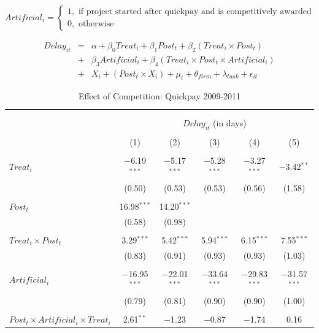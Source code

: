 \documentclass[
]{article}
\begin{document}
\[ Artificial_i = \begin{cases} 1 , \text{ if project started after quickpay and is competitively awarded}\\ 0 , \text{ otherwise } \end{cases}
\]

\[ \begin{aligned}
Delay_{it} &=& \alpha+\beta_0 Treat_i + \beta_1 Post_t + \beta_2 (Treat_i \times Post_t) \\
&+&\beta_3 Artificial_i + \beta_4 (Treat_i \times Post_t \times Artificial_i) \\ 
&+&X_i + (Post_t \times X_i) + \mu_t + \theta_{firm} + \lambda_{task}+ \epsilon_{it}
\end{aligned}\]

\begin{table}[H] \centering 
  \caption{Effect of Competition: Quickpay 2009-2011} 
  \label{} 
\small 
\begin{tabular}{@{\extracolsep{-2pt}}lccccc} 
\\[-1.8ex]\hline 
\hline \\[-1.8ex] 
\\[-1.8ex] & \multicolumn{5}{c}{$Delay_{it}$ (in days)} \\ 
\\[-1.8ex] & (1) & (2) & (3) & (4) & (5)\\ 
\hline \\[-1.8ex] 
 $Treat_i$ & $-$6.19$^{***}$ & $-$5.17$^{***}$ & $-$5.28$^{***}$ & $-$3.27$^{***}$ & $-$3.42$^{**}$ \\ 
  & (0.50) & (0.53) & (0.53) & (0.56) & (1.58) \\ 
  & & & & & \\ 
 $Post_t$ & 16.98$^{***}$ & 14.20$^{***}$ &  &  &  \\ 
  & (0.58) & (0.98) &  &  &  \\ 
  & & & & & \\ 
 $Treat_i \times Post_t$ & 3.29$^{***}$ & 5.42$^{***}$ & 5.94$^{***}$ & 6.15$^{***}$ & 7.55$^{***}$ \\ 
  & (0.83) & (0.91) & (0.93) & (0.93) & (1.03) \\ 
  & & & & & \\ 
 $Artificial_i$ & $-$16.95$^{***}$ & $-$22.01$^{***}$ & $-$33.64$^{***}$ & $-$29.83$^{***}$ & $-$31.57$^{***}$ \\ 
  & (0.79) & (0.81) & (0.90) & (0.90) & (1.00) \\ 
  & & & & & \\ 
 $Post_t \times Artificial_i \times Treat_i$ & 2.61$^{**}$ & $-$1.23 & $-$0.87 & $-$1.74 & 0.16 \\ 

\end{tabular}
\end{table}
\end{document}
